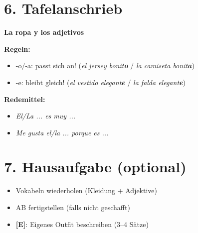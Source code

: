 \documentclass[11pt, a4paper]{article}
\newcommand{\erweiterung}{\textcolor{erweiterungpurple}{\textbf{[E]}}}
\begin{document}
\section*{6. Tafelanschrieb}

\begin{hinweisbox}
\textbf{La ropa y los adjetivos}

\vspace{4pt}
\textbf{Regeln:}
\begin{itemize}[leftmargin=*, itemsep=2pt]
    \item -o/-a: passt sich an! (\textit{el jersey bonit\textbf{o}} / \textit{la camiseta bonit\textbf{a}})
    \item -e: bleibt gleich! (\textit{el vestido elegant\textbf{e}} / \textit{la falda elegant\textbf{e}})
\end{itemize}

\textbf{Redemittel:}
\begin{itemize}[leftmargin=*, itemsep=2pt]
    \item \textit{El/La ... es muy ...}
    \item \textit{Me gusta el/la ... porque es ...}
\end{itemize}
\end{hinweisbox}


\section*{7. Hausaufgabe (optional)}

\begin{itemize}[leftmargin=*, itemsep=2pt]
    \item Vokabeln wiederholen (Kleidung + Adjektive)
    \item AB fertigstellen (falls nicht geschafft)
    \item \erweiterung{}: Eigenes Outfit beschreiben (3--4 Sätze)
\end{itemize}
\end{document}
